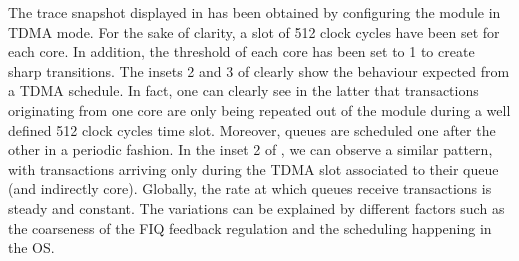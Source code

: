 The trace snapshot displayed in  has
been obtained by configuring the \schim module in TDMA mode. For the
sake of clarity, a slot of 512 clock cycles have been set for each
core. In addition, the threshold of each core has been set to 1 to
create sharp transitions.  The insets 2 and 3 of
 clearly show the behaviour expected
from a TDMA schedule. In fact, one can clearly see in the latter that
transactions originating from one core are only being repeated out of
the \schim module during a well defined 512 clock cycles time
slot. Moreover, queues are scheduled one after the other in a periodic
fashion.  In the inset 2 of , we can
observe a similar pattern, with transactions arriving only during the
TDMA slot associated to their queue (and indirectly core). Globally,
the rate at which queues receive transactions is steady and
constant. The variations can be explained by different factors such as
the coarseness of the FIQ feedback regulation and the scheduling
happening in the OS.

